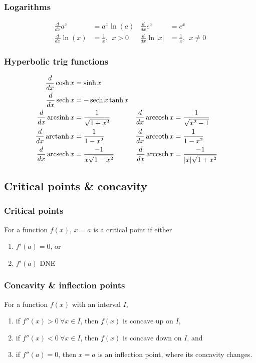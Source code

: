 \documentclass[main.tex]{subfiles}
\begin{document}
\begin{multicols}{2}
	\subsubsection*{Logarithms}
	\begin{align*}
		\frac{d}{dx} a^x &= a^x \ln{(a)} & \frac{d}{dx} e^x &= e^x \\
		\frac{d}{dx} \ln{(x)} &= \frac{1}{x}, \ \ x > 0 & \frac{d}{dx} \ln{|x|} &= \frac{1}{x}, \ \ x \neq 0
	\end{align*}

	\subsubsection*{Hyperbolic trig functions}
	\begin{align*}
		\frac{d}{dx} \cosh{x} &= \sinh{x} \\
		\frac{d}{dx} \operatorname{sech}{x} &= -\operatorname{sech}{x} \tanh{x} \\
		\frac{d}{dx} \operatorname{arcsinh}{x} &= \frac{1}{\sqrt{1 + x^2}} & \frac{d}{dx} \operatorname{arccosh}{x} &= \frac{1}{\sqrt{x^2 - 1}} \\
		\frac{d}{dx} \operatorname{arctanh}{x} &= \frac{1}{1 - x^2} & \frac{d}{dx} \operatorname{arccoth}{x} &= \frac{1}{1 - x^2} \\
		\frac{d}{dx} \operatorname{arcsech}{x} &= \frac{-1}{x \sqrt{1 - x^2}} & \frac{d}{dx} \operatorname{arccsch}{x} &= \frac{-1}{|x| \sqrt{1 + x^2}}
	\end{align*}

	\subsection*{Critical points \& concavity}
	\subsubsection*{Critical points}
	For a function \(f(x)\), \(x = a\) is a critical point if either
	\begin{enumerate}
		\item \(f'(a) = 0\), or
		\item \(f'(a)\) DNE
	\end{enumerate}

	\subsubsection*{Concavity \& inflection points}
	For a function \(f(x)\) with an interval \(I\),
	\begin{enumerate}
		\item if \(f''(x) > 0 \ \forall x \in I\), then \(f(x)\) is concave up on \(I\),
		\item if \(f''(x) < 0 \ \forall x \in I\), then \(f(x)\) is concave down on \(I\), and
		\item if \(f''(a) = 0\), then \(x = a\) is an inflection point, where its concavity changes.
	\end{enumerate}


\end{multicols}
\end{document}
